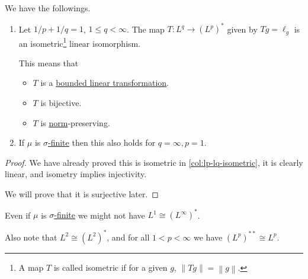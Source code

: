\begin{theorem}
	We have the followings.
	\begin{enumerate}
		\item Let \(1/p + 1/q = 1\), \(1 \leq q < \infty\). The map \(T \colon L^q \to (L^p)^\ast\) given by \(Tg = \ell_g\) is an isometric\footnote{A map \(T\) is called isometric if for a given \(g\), \(\left\lVert Tg\right\rVert = \left\lVert g\right\rVert \).}
		      linear isomorphism.

		      This means that
		      \begin{itemize}
			      \item \(T\) is a \hyperref[def:bounded-linear-transformation]{bounded linear transformation}.
			      \item \(T\) is bijective.
			      \item \(T\) is \hyperref[def:norm]{norm}-preserving.
		      \end{itemize}
		\item If \(\mu\) is \hyperref[def:finite-measure]{\(\sigma\)-finite} then this also holds for \(q = \infty, p = 1\).
	\end{enumerate}
\end{theorem}
\begin{proof}
	We have already proved this is isometric in \autoref{col:lp-lq-isometric}, it is clearly linear, and isometry implies injectivity.

	We will prove that it is surjective later.
\end{proof}
\begin{note}
	Even if \(\mu\) is \hyperref[def:finite-measure]{\(\sigma\)-finite} we might not have \(L^1 \cong (L^\infty)^\ast\).

	Also note that \(L^2 \cong (L^2)^\ast\), and for all \(1 < p < \infty\) we have \((L^p)^{\ast\ast} \cong L^p\).
\end{note}
